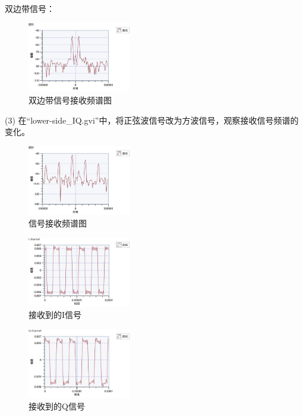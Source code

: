 \documentclass{../source/Experiment}
\begin{document}
双边带信号：

\begin{figure}[H]
    \centering
    \includegraphics[width = 0.4\textwidth]{lab9/DOUBLE.png}
    \caption{双边带信号接收频谱图}
\end{figure}

(3) 在“lower-side\_IQ.gvi”中，将正弦波信号改为方波信号，观察接收信号频谱的 变化。
\begin{figure}[H]
    \centering
    \includegraphics[width = 0.4\textwidth]{lab9/LOWER_SQUARE.png}
    \caption{信号接收频谱图}
\end{figure}
\begin{figure}[H]
    \centering
    \includegraphics[width = 0.4\textwidth]{lab9/LOWER_SQUARE_I.png}
    \caption{接收到的I信号}
\end{figure}
\begin{figure}[H]
    \centering
    \includegraphics[width = 0.4\textwidth]{lab9/LOWER_SQUARE_Q.png}
    \caption{接收到的Q信号}
\end{figure}
\end{document}
